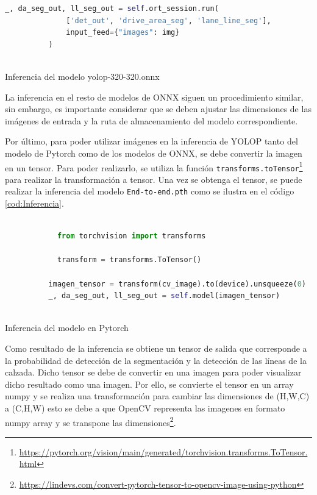         \begin{code}[h]
          \begin{lstlisting}[language=Python]
            _, da_seg_out, ll_seg_out = self.ort_session.run(
              ['det_out', 'drive_area_seg', 'lane_line_seg'],
              input_feed={"images": img}
          )
        
          \end{lstlisting}
          \caption[Inferencia del modelo yolop-320-320.onnx]{Inferencia del modelo yolop-320-320.onnx}
          \label{cod:Inferencia_onnx}
          \end{code}  

        La inferencia en el resto de modelos de ONNX siguen un procedimiento similar, sin embargo, es importante considerar que se deben ajustar las dimensiones de las imágenes de entrada
        y la ruta de almacenamiento del modelo correspondiente.

        Por último, para poder utilizar imágenes en la inferencia de YOLOP tanto del modelo de Pytorch como de los modelos de ONNX, se debe convertir la imagen en un tensor. Para poder realizarlo, se utiliza la función \texttt{transforms.toTensor}\footnote{\url{https://pytorch.org/vision/main/generated/torchvision.transforms.ToTensor.html}} 
        para realizar la transformación a tensor. Una vez se obtenga el tensor, se puede realizar la inferencia del modelo \texttt{End-to-end.pth} como se ilustra en el código \ref{cod:Inferencia}.
    
        \begin{code}[h]
          \begin{lstlisting}[language=Python]
         
            from torchvision import transforms
    
            transform = transforms.ToTensor() 
                        
          imagen_tensor = transform(cv_image).to(device).unsqueeze(0)
          _, da_seg_out, ll_seg_out = self.model(imagen_tensor)
        
          \end{lstlisting}
          \caption[Inferencia del modelo]{Inferencia del modelo en Pytorch}
          \label{cod:Inferencia}
          \end{code}  
    
        Como resultado de la inferencia se obtiene un tensor de salida que corresponde a la probabilidad de detección de la segmentación
        y la detección de las líneas de la calzada. Dicho tensor se debe de convertir en una imagen para poder visualizar
        dicho resultado como una imagen. 
        Por ello, se convierte el tensor en un array numpy y se realiza una transformación para cambiar las dimensiones de (H,W,C) 
        a (C,H,W) esto se debe a que OpenCV representa las imagenes en formato numpy array y se transpone las dimensiones\footnote{\url{https://lindevs.com/convert-pytorch-tensor-to-opencv-image-using-python}}. 
    
